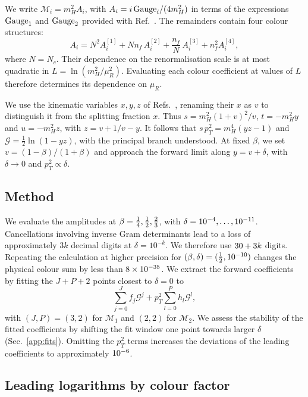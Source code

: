 \documentclass[%
 onecolumn,
 superscriptaddress,
 preprintnumbers,
 nofootinbib,
 amsmath,amssymb,
 aps,
 prl,
]{revtex4-2}
\newcommand{\G}{\mathcal G}
\newcommand{\M}{\mathcal M}
\begin{document}
We write $\M_i=m_H^2A_i$, with
$A_i=i\,{\rm Gauge}_i/(4m_H^2)$ in terms of the
expressions ${\rm Gauge}_1$ and ${\rm Gauge}_2$
provided with Ref.~\cite{Banerjee:2018lfq}.
The remainders contain four colour structures:
\begin{equation}
A_i=N^2A_i^{[1]}+Nn_f\,A_i^{[2]}+\frac{n_f}{N}\,A_i^{[3]}+n_f^2A_i^{[4]},
\label{eq:colourdec}
\end{equation}
where $N=N_c$. Their dependence on the renormalisation
scale is at most quadratic in
$L=\ln(m_H^2/\mu_R^2)$. Evaluating each colour
coefficient at \lValueCount{} values of $L$
therefore determines its dependence on $\mu_R$.

We use the kinematic variables $x,y,z$ of
Refs.~\cite{Banerjee:2018lfq,Bhattacharya:2019oun},
renaming their $x$ as $v$ to distinguish it
from the splitting fraction $x$. Thus
$s=m_H^2(1+v)^2/v$, $t=-m_H^2y$ and
$u=-m_H^2z$, with $z=v+1/v-y$. It follows that
$s\,p_T^2=m_H^4(yz-1)$ and
$\G=\frac12\ln(1-yz)$, with the principal
branch understood. At fixed $\beta$, we set
$v=(1-\beta)/(1+\beta)$ and approach the
forward limit along $y=v+\delta$, with
$\delta\to0$ and $p_T^2\propto\delta$.

\subsection{Method}
\label{sec:method}

We evaluate the amplitudes at $\beta=\frac14,\frac12,\frac23$,
with $\delta=10^{-4},\ldots,10^{-11}$.
Cancellations involving inverse Gram determinants
lead to a loss of approximately $3k$ decimal digits
at $\delta=10^{-k}$. We therefore use
$30+3 k$ digits.
Repeating the calculation at higher precision
for $(\beta,\delta)=(\frac12,10^{-10})$
changes the physical colour sum by less
than $8\times10^{-35}$.
%
We extract the forward coefficients by fitting
the $J+P+2$ points closest to $\delta=0$ to
\begin{equation}
\sum_{j=0}^{J}f_j\G^j+p_T^2\sum_{l=0}^{P}h_l\G^l,
\label{eq:fit}
\end{equation}
with $(J,P)=(3,2)$ for $\M_1$ and
$(2,2)$ for $\M_2$. We assess the stability
of the fitted coefficients by shifting the fit
window one point towards larger $\delta$
(Sec.~\ref{app:fits}). Omitting the
$p_T^2$ terms increases the deviations of
the leading coefficients to approximately
$10^{-6}$.

\subsection{Leading logarithms by colour factor}
\end{document}
